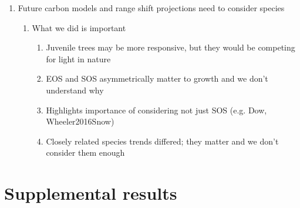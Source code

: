 \documentclass{article}\usepackage[]{graphicx}\usepackage[]{xcolor}
\begin{document}
\begin{enumerate}
\item Future carbon models and range shift projections need to consider species 

  \begin{enumerate}
  \item What we did is important 
    \begin{enumerate}
  
    \item Juvenile trees may be more responsive, but they would be competing for light in nature
    
    \item EOS and SOS asymmetrically matter to growth and we don't understand why
    
    \item Highlights importance of considering not just SOS (e.g. Dow, Wheeler2016Snow)
  
    \item Closely related species trends differed; they matter and we don't consider them enough
    
    \end{enumerate}

  \end{enumerate}
\end{enumerate}

\clearpage
\section*{Supplemental results}

\setcounter{table}{0}
\renewcommand{\thetable}{S\arabic{table}}
\setcounter{figure}{0}
\renewcommand{\thefigure}{S\arabic{figure}}
\end{document}

